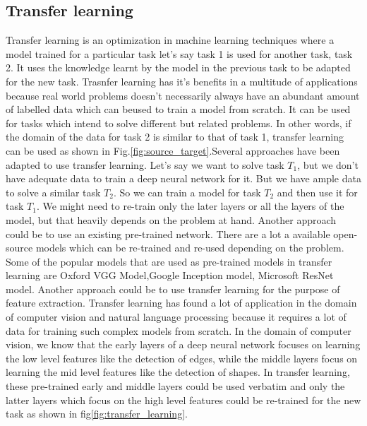 \subsection{Transfer learning}
Transfer learning is an optimization in machine learning techniques where a model trained for a particular task let's say task 1 is used for another task, task 2. It uses the knowledge learnt by the model in the previous task to be adapted for the new task. Trasnfer learning has it's benefits in a multitude of applications because real world problems doesn't necessarily always have an abundant amount of labelled data which can beused to train a model from scratch\cite*{weiss2016survey}. It can be used for tasks which intend to solve different but related problems\cite{weiss2016survey}. In other words, if the domain of the data for task 2 is similar to that of task 1, transfer learning can be used as shown in Fig.\ref*{fig:source_target}.Several approaches have been adapted to use transfer learning. Let's say we want to solve task $T_{1}$, but we don't have adequate data to train a deep neural network for it. But we have ample data to solve a similar task $T_{2}$. So we can train a model for task $T_{2}$ and then use it for task $T_{1}$. We might need to re-train only the later layers or all the layers of the model, but that heavily depends on the problem at hand. Another approach could be to use an existing pre-trained network. There are a lot a available open-source models which can be re-trained and re-used depending on the problem. Some of the popular models that are used as pre-trained models in transfer learning are Oxford VGG Model\cite*{simonyan2014very},Google Inception model\cite*{szegedy2015going}, Microsoft ResNet model\cite*{he2016deep}. Another approach could be to use transfer learning for the purpose of feature extraction. Transfer learning has found a lot of application in the domain of computer vision and natural language processing because it requires a lot of data for training such complex models from scratch. In the domain of computer vision, we know that the early layers of a deep neural network focuses on learning the low level features like the detection of edges, while the middle layers focus on learning the mid level features like the detection of shapes. In transfer learning, these pre-trained early and middle layers could be used verbatim and only the latter layers which focus on the high level features could be re-trained for the new task as shown in fig\ref*{fig:transfer_learning}.
